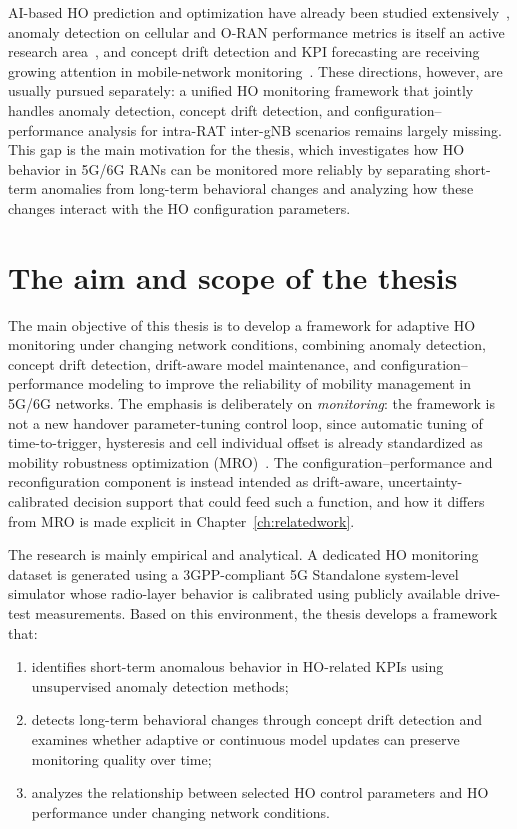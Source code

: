 AI-based HO prediction and optimization have already been studied extensively~\cite{seq2seqMob2022,slicedDRL2024}, anomaly detection on cellular and O-RAN performance metrics is itself an active research area~\cite{oranAnomaly2025,oranBenchmark2023}, and concept drift detection and KPI forecasting are receiving growing attention in mobile-network monitoring~\cite{leaf,forecast5g2024}. These directions, however, are usually pursued separately: a unified HO monitoring framework that jointly handles anomaly detection, concept drift detection, and configuration--performance analysis for intra-RAT inter-gNB scenarios remains largely missing. This gap is the main motivation for the thesis, which investigates how HO behavior in 5G/6G RANs can be monitored more reliably by separating short-term anomalies from long-term behavioral changes and analyzing how these changes interact with the HO configuration parameters.

\section{The aim and scope of the thesis}

The main objective of this thesis is to develop a framework for adaptive HO monitoring under changing network conditions, combining anomaly detection, concept drift detection, drift-aware model maintenance, and configuration--performance modeling to improve the reliability of mobility management in 5G/6G networks. The emphasis is deliberately on \emph{monitoring}: the framework is not a new handover parameter-tuning control loop, since automatic tuning of time-to-trigger, hysteresis and cell individual offset is already standardized as mobility robustness optimization (MRO)~\cite{tr36839,ts28313}. The configuration--performance and reconfiguration component is instead intended as drift-aware, uncertainty-calibrated decision support that could feed such a function, and how it differs from MRO is made explicit in Chapter~\ref{ch:relatedwork}.

The research is mainly empirical and analytical. A dedicated HO monitoring dataset is generated using a 3GPP-compliant 5G Standalone system-level simulator whose radio-layer behavior is calibrated using publicly available drive-test measurements. Based on this environment, the thesis develops a framework that:
\begin{enumerate}
\item identifies short-term anomalous behavior in HO-related KPIs using unsupervised anomaly detection methods;

\item detects long-term behavioral changes through concept drift detection and examines whether adaptive or continuous model updates can preserve monitoring quality over time;

\item analyzes the relationship between selected HO control parameters and HO performance under changing network conditions.

\end{enumerate}


